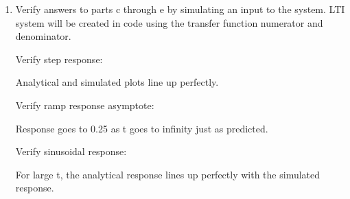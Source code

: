 \documentclass[12pt]{article}
\begin{document}
\begin{enumerate}
\begin{enumerate}
        \item Verify answers to parts c through e by simulating an input to the system. LTI system will be created in code using the transfer function numerator and denominator.
        
        Verify step response:

        \begin{center}
            
        \end{center}

        Analytical and simulated plots line up perfectly.

        Verify ramp response asymptote:

        \begin{center}
            
        \end{center}

        Response goes to 0.25 as t goes to infinity just as predicted.

        Verify sinusoidal response:

        \begin{center}
            
        \end{center}

        For large t, the analytical response lines up perfectly with the simulated response.
    \end{enumerate}
    

\end{enumerate}
\end{document}

